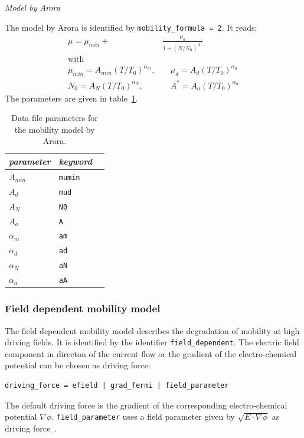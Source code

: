 \bigskip
\noindent\textsl{Model by Arora}~\cite{arora}
\smallskip

\noindent The model by Arora is identified by \verb+mobility_formula = 2+.
It reads:
\begin{align}
\mu = \mu_{min} +& \frac{\mu_d}{1+(N/N_0)^{A^*}} \\
\text{with} \nonumber \\
\mu_{min} = A_{min}(T/T_0)^{\alpha_m},& \quad \mu_d = A_d(T/T_0)^{\alpha_d} \nonumber \\
N_0 = A_N(T/T_0)^{\alpha_N},& \quad A^* = A_a(T/T_0)^{\alpha_a} \nonumber 
\end{align}
The parameters are given in table~\ref{table:mobility_arora}.
\begin{table}[htb]
\center
\begin{tabular}{l||l|l}
\textit{parameter} & \textit{keyword} \\
\hline\hline
$A_{min}$ &  \verb+mumin+ \\
$A_d$ &  \verb+mud+ \\
$A_N$ &  \verb+N0+ \\
$A_a$ &  \verb+A+ \\
$\alpha_m$ &  \verb+am+ \\
$\alpha_d$ &  \verb+ad+ \\
$\alpha_N$ &  \verb+aN+ \\
$\alpha_a$ &  \verb+aA+ \\
\end{tabular}
\caption{Data file parameters for the mobility model by Arora.}
\label{table:mobility_arora}
\end{table}

\subsubsection{Field dependent mobility model}

The field dependent mobility model describes the degradation of mobility at high driving fields.
It is identified by the identifier \texttt{field\_dependent}.
The electric field component in directon of the current flow or the gradient of the electro-chemical potential can be chosen as driving force:
\begin{verbatim}
driving_force = efield | grad_fermi | field_parameter
\end{verbatim}
The default driving force is the gradient of the corresponding electro-chemical potential $\nabla\phi$.
\texttt{field\_parameter} uses a field parameter given by $\sqrt{E\cdot\nabla\phi}$ as driving force~\cite{??}.


